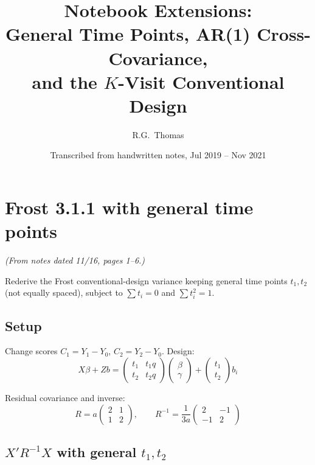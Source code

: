 \documentclass[11pt]{article}
\title{Notebook Extensions:\\
  General Time Points, AR(1) Cross-Covariance,\\
  and the $K$-Visit Conventional Design}
\author{R.G.\ Thomas}
\date{Transcribed from handwritten notes, Jul 2019 -- Nov 2021}
\begin{document}
\maketitle
\tableofcontents


\section{Frost 3.1.1 with general time points}
\label{sec:general_time}

\noindent
\textit{(From notes dated 11/16, pages 1--6.)}

\medskip
\noindent
Rederive the Frost conventional-design variance keeping
general time points $t_1, t_2$ (not equally spaced), subject
to $\sum t_i = 0$ and $\sum t_i^2 = 1$.

\subsection{Setup}

Change scores $C_1 = Y_1 - Y_0$, $C_2 = Y_2 - Y_0$.
Design:
\begin{equation}
  X\beta + Zb
  = \begin{pmatrix} t_1 & t_1 q \\ t_2 & t_2 q \end{pmatrix}
    \begin{pmatrix} \beta \\ \gamma \end{pmatrix}
  + \begin{pmatrix} t_1 \\ t_2 \end{pmatrix} b_i
\end{equation}

Residual covariance and inverse:
\begin{equation}
  R = a\begin{pmatrix} 2 & 1 \\ 1 & 2 \end{pmatrix},
  \qquad
  R^{-1} = \frac{1}{3a}\begin{pmatrix}
    2 & -1 \\ -1 & 2
  \end{pmatrix}
\end{equation}

\subsection{$X'R^{-1}X$ with general $t_1, t_2$}
\end{document}
